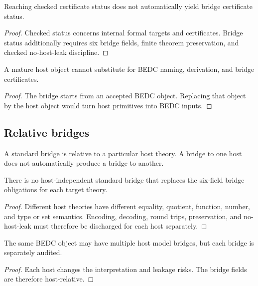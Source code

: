 \begin{theorem}
\label{thm:philosophy-checked-not-bridged}
Reaching checked certificate status does not automatically yield bridge
certificate status.
\end{theorem}
\begin{proof}
Checked status concerns internal formal targets and certificates.
Bridge status additionally requires six bridge fields, finite theorem
preservation, and checked no-host-leak discipline.
\end{proof}

\begin{corollary}
\label{cor:philosophy-host-maturity-not-replace-bedc-certification}
A mature host object cannot substitute for BEDC naming, derivation, and
bridge certificates.
\end{corollary}
\begin{proof}
The bridge starts from an accepted BEDC object. Replacing that object
by the host object would turn host primitives into BEDC inputs.
\end{proof}

\subsection{Relative bridges}
\label{subsec:philosophy-relative-bridges}

\begin{definition}
\label{def:philosophy-host-relative-bridge}
A standard bridge is relative to a particular host theory. A bridge to
one host does not automatically produce a bridge to another.
\end{definition}

\begin{theorem}
\label{thm:philosophy-no-absolute-bridge}
There is no host-independent standard bridge that replaces the
six-field bridge obligations for each target theory.
\end{theorem}
\begin{proof}
Different host theories have different equality, quotient, function,
number, and type or set semantics. Encoding, decoding, round trips,
preservation, and no-host-leak must therefore be discharged for each
host separately.
\end{proof}

\begin{corollary}
\label{cor:philosophy-model-plurality-audited}
The same BEDC object may have multiple host model bridges, but each
bridge is separately audited.
\end{corollary}
\begin{proof}
Each host changes the interpretation and leakage risks. The bridge
fields are therefore host-relative.
\end{proof}

